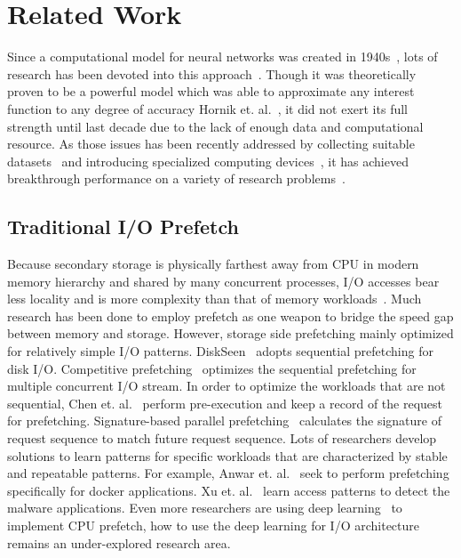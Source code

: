 \section{Related Work}

Since a computational model for neural networks was created in 1940s~\cite{McCulloch1943},
lots of research has been devoted into this approach~\cite{pouyanfar2018survey}.
Though it was theoretically proven to be a powerful model which was able to approximate any interest function to any degree of accuracy
Hornik et. al.~\cite{Hornik1989}, it did not exert its full strength until last decade due to the lack of enough data and computational resource.
As those issues has been recently addressed by collecting suitable datasets~\cite{JiaDeng2009}
and introducing specialized computing devices~\cite{Krizhevsky2012, Jouppi2017},
it has achieved breakthrough performance on a variety of research problems~\cite{Krizhevsky2012, Mnih2015, Silver2016, Bahdanau2014}.

\subsection{Traditional I/O Prefetch}

Because secondary storage is physically farthest away from CPU in modern memory hierarchy
and shared by many concurrent processes,
I/O accesses bear less locality and is more complexity than that of memory workloads~\cite{yang1992novel, wang1995cat}.
Much research has been done to employ prefetch as one weapon to bridge the speed gap between memory and storage.
However, storage side prefetching mainly optimized for relatively simple I/O patterns.
DiskSeen~\cite{ding2007diskseen} adopts sequential prefetching for disk I/O.
Competitive prefetching~\cite{li2007competitive} optimizes the sequential prefetching for multiple concurrent I/O stream.
In order to optimize the workloads that are not sequential,
Chen et. al.~\cite{chen2008hiding} perform pre-execution and keep a record of the request for prefetching.
Signature-based parallel prefetching~\cite{byna2008parallel} calculates the signature of request sequence to match future request sequence. %
Lots of researchers develop solutions to learn patterns for
specific workloads that are characterized by stable and repeatable patterns.
For example, Anwar et. al.~\cite{anwar2018improving} seek to perform
prefetching specifically for docker applications. %
Xu et. al.~\cite{xu2017malware} learn access patterns to detect
the malware applications.
Even more researchers are using deep learning~\cite{hashemi2018learning, peled2018towards} to implement CPU prefetch,
how to use the deep learning for I/O architecture remains an under-explored research area.

